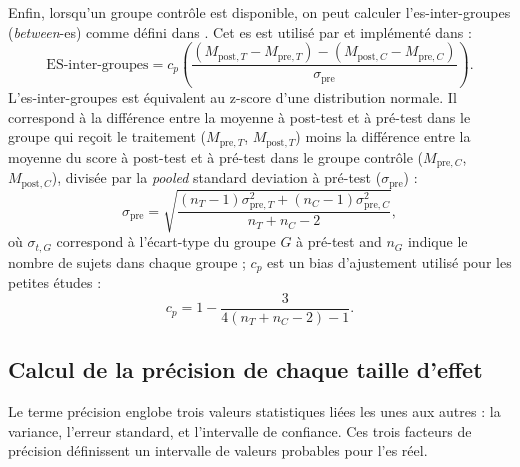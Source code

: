 Enfin, lorsqu'un groupe contrôle est disponible, on peut calculer l'\gls{es}-inter-groupes (\textit{between}-\gls{es}) comme défini dans \citet{Morris2008}.
Cet \gls{es} est utilisé par \citet{Cortese2016, Micoulaud2014} et implémenté dans \citet{Bussalb2019} :
\begin{equation}
\label{eq:metareview_effect_size_between}
\text{ES-inter-groupes} = c_p \left(\frac{(M_{\text{post},T} - M_{\text{pre},T}) - (M_{\text{post},C} - M_{\text{pre},C}) }{\sigma_{\text{pre}}} \right).
\end{equation} 
L'\gls{es}-inter-groupes est équivalent au z-score d'une distribution normale. Il correspond à la différence entre la moyenne à post-test et à pré-test 
dans le groupe qui reçoit le traitement ($M_{\text{pre},T}$, $M_{\text{post},T}$) moins la différence entre la moyenne du score à post-test et à pré-test 
dans le groupe contrôle ($M_{\text{pre},C}$, $M_{\text{post},C}$), divisée par la \textit{pooled} standard deviation à pré-test ($\sigma_{\text{pre}}$) :
\begin{equation}
\label{eq:stats_metareview_std_pre}
\sigma_{\text{pre}} = \sqrt{\frac{(n_T - 1)\sigma_{\text{pre},T}^2 + (n_C - 1)\sigma_{\text{pre},C}^2} {n_T + n_C - 2}},
\end{equation}
où $\sigma_{t,G}$ correspond à l'écart-type du groupe $G$ à pré-test and $n_G$ indique le nombre de sujets dans chaque groupe ; 
$c_p$ est un bias d'ajustement utilisé pour les petites études :
\begin{equation}
\label{eq:metareview_correction_factor}
c_p =  1 - \frac{3} {4(n_T + n_C - 2) - 1}. 
\end{equation} 

\subsection{Calcul de la précision de chaque taille d'effet}

Le terme précision englobe trois valeurs statistiques liées les unes aux autres : la variance, l'erreur standard, et l'intervalle de confiance.
Ces trois facteurs de précision définissent un intervalle de valeurs probables pour l'\gls{es} réel. 


